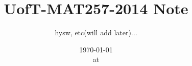 

\usepackage{datetime}
\usepackage{fancyhdr}

\newcommand{\refto}[1]{\{#1\}}
\newcommand{\extranote}[1]{{\color{Black!30}#1}}
\newcommand{\thmIF}{\textbf{\color{Red!50!Black}IF}}
\newcommand{\thmTHEN}{\textbf{\color{Blue!50!Black}THEN}}



\title{UofT-MAT257-2014 Note}
\author{hysw, etc(will add later)...}
\date{\today\\ at \currenttime}

\pagestyle{fancy}
\rfoot{}
\cfoot{}
\lfoot{}
